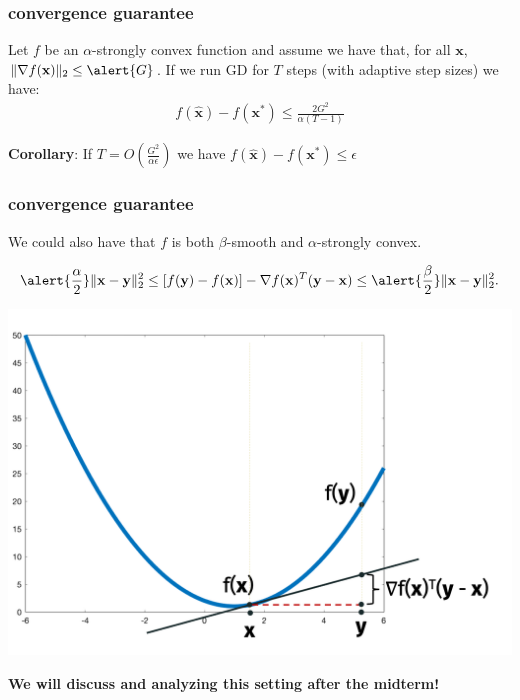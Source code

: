 \documentclass[compress]{beamer}
\newcommand{\bv}[1]{\mathbf{#1}}
\begin{document}
\begin{frame}[t]
	\frametitle{convergence guarantee}
	\begin{theorem}
		Let $f$ be an \alert{$\alpha$}-strongly convex function and assume we have that, for all $\bv{x}$, $\|\nabla f(\bv{x})\|_2 \leq \alert{G}$. If we run GD for $T$ steps (with adaptive step sizes) we have:
		\begin{align*}
			f(\hat{\bv{x}}) - f(\bv{x}^*) \leq \frac{2G^2}{\alpha(T-1)} 
		\end{align*} 
	\end{theorem}
	\textbf{Corollary}: If \alert{$T = O\left(\frac{G^2}{\alpha \epsilon}\right)$} we have $f(\hat{\bv{x}}) - f(\bv{x}^*) \leq \epsilon$
\end{frame}

\begin{frame}[t]
	\frametitle{convergence guarantee}
	\begin{center}
		We could also have that $f$ is both $\beta$-smooth and $\alpha$-strongly convex.
	\end{center}
	\begin{align*}
		\alert{\frac{\alpha}{2}}\|\bv{x} - \bv{y}\|_2^2 \leq \left[f(\bv{y}) - f(\bv{x})\right] - \nabla f(\bv{x})^T(\bv{y} - \bv{x}) \leq \alert{\frac{\beta}{2}}\|\bv{x} - \bv{y}\|_2^2.
	\end{align*}
\vspace{-2em}
\begin{center}
	\includegraphics[width=.6\textwidth]{smoothness_image.png}

	\textbf{We will discuss and analyzing this setting after the midterm!}
\end{center}	
\end{frame}

	
\end{document}
